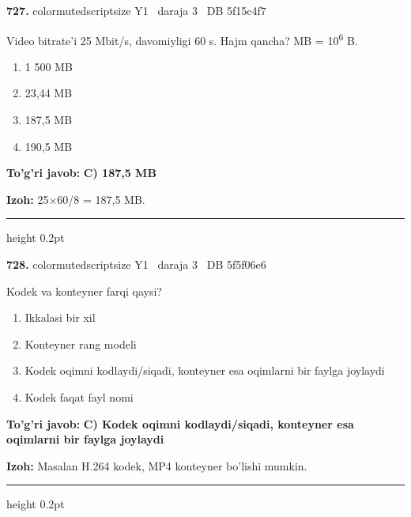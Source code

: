 \documentclass[10pt,a4paper,oneside]{article}
\begin{document}
\noindent\textbf{\color{ink}727.}  {color{muted}scriptsize Y1 \textbullet\ daraja 3 \textbullet\ DB 5f15c4f7}
\par
Video bitrate'i 25 Mbit/s, davomiyligi 60 s. Hajm qancha? MB = 10\textsuperscript{6} B.
\begin{enumerate}[label=\Alph*),leftmargin=9mm]
\item 1 500 MB
\item 23,44 MB
\item 187,5 MB
\item 190,5 MB
\end{enumerate}
\begin{tcolorbox}[enhanced,breakable,colback=teal!4,colframe=teal!50!black,boxrule=0.5pt,arc=1.1mm,left=3mm,right=3mm,top=1.7mm,bottom=1.7mm,before skip=2mm,after skip=2mm]
\textbf{\color{teal}To'g'ri javob:} \textbf{C) 187,5 MB}
\par\smallskip
\textbf{Izoh:} 25\ensuremath{\times}60/8 = 187,5 MB.
\end{tcolorbox}
\vspace{2mm}\hrule height 0.2pt \vspace{3mm}

\noindent\textbf{\color{ink}728.}  {color{muted}scriptsize Y1 \textbullet\ daraja 3 \textbullet\ DB 5f5f06e6}
\par
Kodek va konteyner farqi qaysi?
\begin{enumerate}[label=\Alph*),leftmargin=9mm]
\item Ikkalasi bir xil
\item Konteyner rang modeli
\item Kodek oqimni kodlaydi/siqadi, konteyner esa oqimlarni bir faylga joylaydi
\item Kodek faqat fayl nomi
\end{enumerate}
\begin{tcolorbox}[enhanced,breakable,colback=teal!4,colframe=teal!50!black,boxrule=0.5pt,arc=1.1mm,left=3mm,right=3mm,top=1.7mm,bottom=1.7mm,before skip=2mm,after skip=2mm]
\textbf{\color{teal}To'g'ri javob:} \textbf{C) Kodek oqimni kodlaydi/siqadi, konteyner esa oqimlarni bir faylga joylaydi}
\par\smallskip
\textbf{Izoh:} Masalan H.264 kodek, MP4 konteyner bo'lishi mumkin.
\end{tcolorbox}
\vspace{2mm}\hrule height 0.2pt \vspace{3mm}
\end{document}
